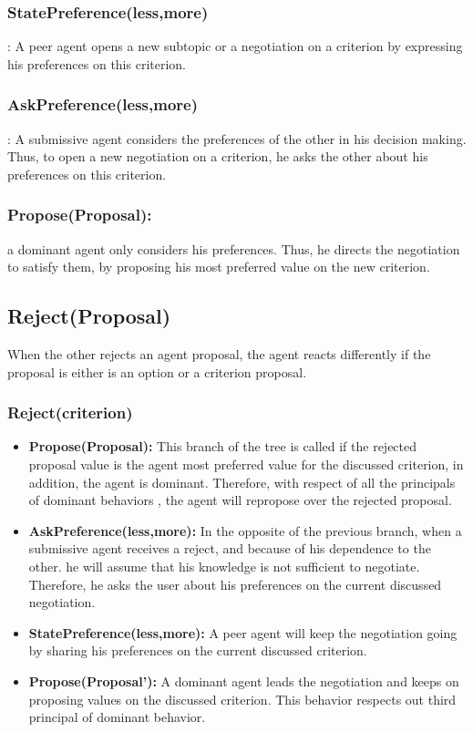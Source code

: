 \documentclass{llncs}
\begin{document}
 \subsubsection{StatePreference(less,more)}:  A peer agent opens a new subtopic or a negotiation on a criterion by expressing his preferences on this criterion.
 \subsubsection{AskPreference(less,more)}:  A submissive agent considers the preferences of the other in his decision making. Thus, to open a new negotiation on a criterion, he asks the other about his preferences on this criterion.
 \subsubsection {Propose(Proposal):} a dominant agent only considers his preferences. Thus, he directs the negotiation to satisfy them, by proposing his most preferred value on the new criterion. 
 
 \subsection{Reject(Proposal)}
 	When the other rejects an agent proposal, the agent reacts differently if the proposal is either is an option or a criterion proposal.
 		\subsubsection{Reject(criterion)}
 		\begin{itemize}
 			\item \textbf{Propose(Proposal):} This branch of the tree is called if the rejected proposal value is the agent most preferred value for the discussed criterion, in addition, the agent is dominant. Therefore, with respect of all the principals of dominant behaviors , the agent will repropose over the rejected proposal.
 			\item \textbf{AskPreference(less,more):} In the opposite of the previous branch, when a submissive agent receives a reject, and because of his dependence to the other. he will assume that his knowledge is not sufficient to negotiate. Therefore, he asks the user about his preferences on the current discussed negotiation. 
 			\item \textbf{StatePreference(less,more):} A peer agent will keep the negotiation going by sharing his preferences on the current discussed criterion.
 			\item\textbf{Propose(Proposal'):} A dominant agent leads the negotiation and keeps on proposing values on the discussed criterion. This behavior respects out third principal of dominant behavior.
 			
 		\end{itemize}
\end{document}
